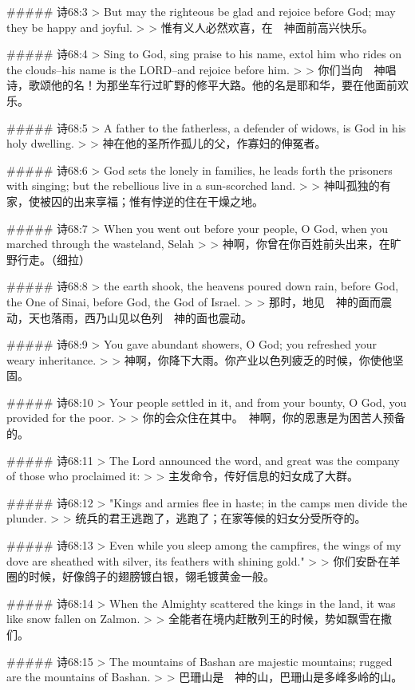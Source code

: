 ##### 诗68:3
> But may the righteous be glad and rejoice before God; may they be happy and joyful.
>
> 惟有义人必然欢喜，在　神面前高兴快乐。


##### 诗68:4
> Sing to God, sing praise to his name, extol him who rides on the clouds--his name is the LORD--and rejoice before him.
>
> 你们当向　神唱诗，歌颂他的名！为那坐车行过旷野的修平大路。他的名是耶和华，要在他面前欢乐。


##### 诗68:5
> A father to the fatherless, a defender of widows, is God in his holy dwelling.
>
> 神在他的圣所作孤儿的父，作寡妇的伸冤者。


##### 诗68:6
> God sets the lonely in families, he leads forth the prisoners with singing; but the rebellious live in a sun-scorched land.
>
> 神叫孤独的有家，使被囚的出来享福；惟有悖逆的住在干燥之地。


##### 诗68:7
> When you went out before your people, O God, when you marched through the wasteland, Selah
>
> 神啊，你曾在你百姓前头出来，在旷野行走。（细拉）


##### 诗68:8
> the earth shook, the heavens poured down rain, before God, the One of Sinai, before God, the God of Israel.
>
> 那时，地见　神的面而震动，天也落雨，西乃山见以色列　神的面也震动。


##### 诗68:9
> You gave abundant showers, O God; you refreshed your weary inheritance.
>
> 神啊，你降下大雨。你产业以色列疲乏的时候，你使他坚固。


##### 诗68:10
> Your people settled in it, and from your bounty, O God, you provided for the poor.
>
> 你的会众住在其中。　神啊，你的恩惠是为困苦人预备的。


##### 诗68:11
> The Lord announced the word, and great was the company of those who proclaimed it:
>
> 主发命令，传好信息的妇女成了大群。


##### 诗68:12
> "Kings and armies flee in haste; in the camps men divide the plunder.
>
> 统兵的君王逃跑了，逃跑了；在家等候的妇女分受所夺的。


##### 诗68:13
> Even while you sleep among the campfires, the wings of my dove are sheathed with silver, its feathers with shining gold."
>
> 你们安卧在羊圈的时候，好像鸽子的翅膀镀白银，翎毛镀黄金一般。


##### 诗68:14
> When the Almighty scattered the kings in the land, it was like snow fallen on Zalmon.
>
> 全能者在境内赶散列王的时候，势如飘雪在撒们。


##### 诗68:15
> The mountains of Bashan are majestic mountains; rugged are the mountains of Bashan.
>
> 巴珊山是　神的山，巴珊山是多峰多岭的山。


